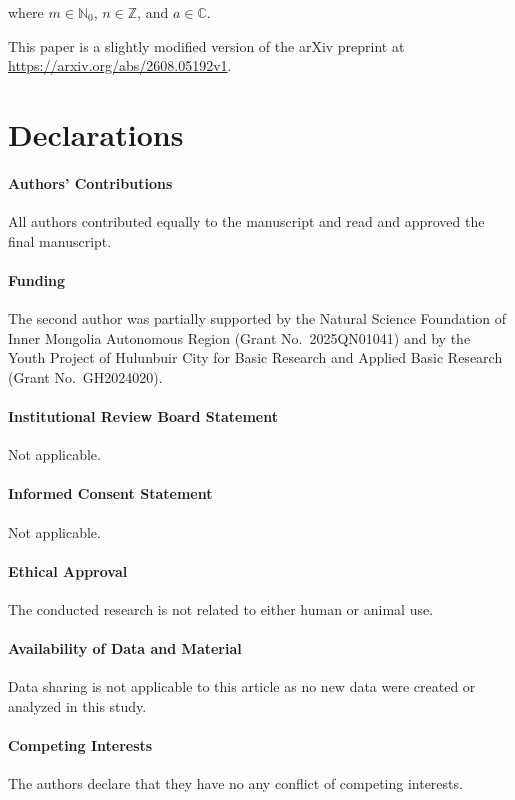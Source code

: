 \documentclass[reqno]{amsart}
\numberwithin{equation}{section}
\theoremstyle{plain}
\theoremstyle{remark}
\begin{document}
where $m\in\mathbb{N}_0$, $n\in\mathbb{Z}$, and $a\in\mathbb{C}$.
\par
This paper is a slightly modified version of the arXiv preprint at \url{https://arxiv.org/abs/2608.05192v1}.

\section{Declarations}

\paragraph{\bf Authors' Contributions}
All authors contributed equally to the manuscript and read and approved the final manuscript.

\paragraph{\bf Funding}
The second author was partially supported by the Natural Science Foundation of Inner Mongolia Autonomous Region (Grant No.~2025QN01041) and by the Youth Project of Hulunbuir City for Basic Research and Applied Basic Research (Grant No.~GH2024020).

\paragraph{\bf Institutional Review Board Statement}
Not applicable.

\paragraph{\bf Informed Consent Statement}
Not applicable.

\paragraph{\bf Ethical Approval}
The conducted research is not related to either human or animal use.

\paragraph{\bf Availability of Data and Material}
Data sharing is not applicable to this article as no new data were created or analyzed in this study.

\paragraph{\bf Competing Interests}
The authors declare that they have no any conflict of competing interests.
\end{document}
